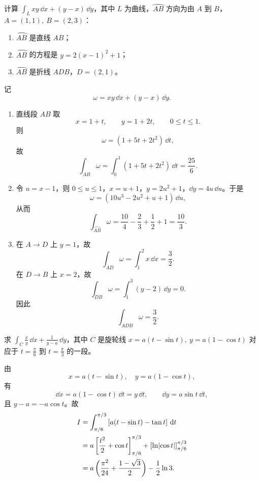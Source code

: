\begin{xexercise}[1]
计算 $\displaystyle\int_Lxy\,\dd x+(y-x)\,\dd y$，其中 $L$ 为曲线，$\wideparen{AB}$ 方向为由 $A$ 到 $B$，$A=(1,1),\ B=(2,3)$：
\begin{enumerate}[label=(\arabic*)]
  \item $\wideparen{AB}$ 是直线 $AB$；
  \item $\wideparen{AB}$ 的方程是 $y=2(x-1)^2+1$；
  \item $\wideparen{AB}$ 是折线 $ADB$，$D=(2,1)$。
\end{enumerate}
\end{xexercise}
\begin{xsolution}
记
\[
  \omega=xy\,\dd x+(y-x)\,\dd y.
\]
\begin{enumerate}[label=(\arabic*)]
\item 直线段 $AB$ 取
\[
  x=1+t,\qquad y=1+2t,\qquad0\le t\le1.
\]
则
\[
  \omega=(1+5t+2t^2)\,\dd t,
\]
故
\[
  \int_{AB}\omega=\int_0^1(1+5t+2t^2)\,\dd t=\frac{25}{6}.
\]

\item 令 $u=x-1$，则 $0\le u\le1$，$x=u+1$，$y=2u^2+1$，$\dd y=4u\,\dd u$。于是
\[
  \omega=(10u^3-2u^2+u+1)\,\dd u,
\]
从而
\[
  \int_{\wideparen{AB}}\omega=\frac{10}{4}-\frac23+\frac12+1=\frac{10}{3}.
\]

\item 在 $A\to D$ 上 $y=1$，故
\[
  \int_{AD}\omega=\int_1^2x\,\dd x=\frac32.
\]
在 $D\to B$ 上 $x=2$，故
\[
  \int_{DB}\omega=\int_1^3(y-2)\,\dd y=0.
\]
因此
\[
  \int_{ADB}\omega=\frac32.
\]
\end{enumerate}
\end{xsolution}
\begin{xexercise}[2]
求 $\displaystyle\int_C\frac{x}{y}\,\dd x+\frac1{y-a}\,\dd y$，其中 $C$ 是旋轮线 $x=a(t-\sin t),\ y=a(1-\cos t)$ 对应于 $t=\frac\pi6$ 到 $t=\frac\pi3$ 的一段。
\end{xexercise}
\begin{xsolution}
由
\[
  x=a(t-\sin t),\quad y=a(1-\cos t),
\]
有
\[
  \dd x=a(1-\cos t)\,\dd t=y\,\dd t,
  \qquad
  \dd y=a\sin t\,\dd t,
\]
且 $y-a=-a\cos t$。故
\begin{align*}
  I
  &=\int_{\pi/6}^{\pi/3}
  \left[a(t-\sin t)-\tan t\right]\,\mathop{}\!\mathrm{d} t\\
  &=a\left[\frac{t^2}{2}+\cos t\right]_{\pi/6}^{\pi/3}
    +\left[\ln\lvert\cos t\rvert\right]_{\pi/6}^{\pi/3}\\
  &=a\left(\frac{\pi^2}{24}+\frac{1-\sqrt3}{2}\right)
    -\frac12\ln3.
\end{align*}
\end{xsolution}

